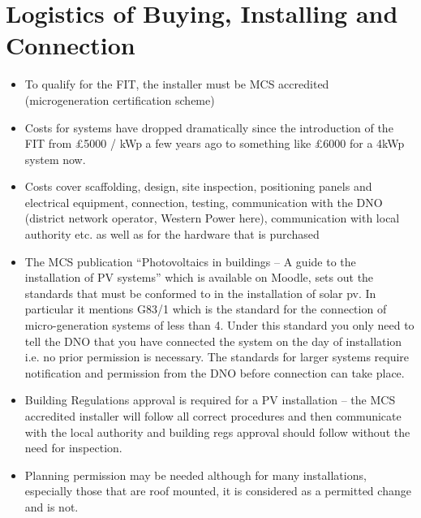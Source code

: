 \documentclass{article}
\begin{document}
\section{Logistics of Buying, Installing and Connection}
\begin{itemize}
\item To qualify for the FIT, the installer must be MCS accredited (microgeneration certification scheme)
\item Costs for systems have dropped dramatically since the introduction of the FIT from £5000 / kWp a few years ago to something like £6000 for a 4kWp system now.
\item Costs cover scaffolding, design, site inspection, positioning panels and electrical equipment, connection, testing, communication with the DNO (district network operator, Western Power here), communication with local authority etc. as well as for the hardware that is purchased
\item The MCS publication “Photovoltaics in buildings – A guide to the installation of PV systems” \cite{MCS_PV_Guide} which is available on Moodle, sets out the standards that must be conformed to in the installation of solar pv. In particular it mentions G83/1 which is the standard for the connection of micro-generation systems of less than \SI{4}{\kilowattpeak}. Under this standard you only need to tell the DNO that you have connected the system on the day of installation i.e. no prior permission is necessary. The standards for larger systems require notification and permission from the DNO before connection can take place. 
\item Building Regulations approval is required for a PV installation – the MCS accredited installer will follow all correct procedures and then communicate with the local authority and building regs approval should follow without the need for inspection.
\item Planning permission may be needed although for many installations, especially those that are roof mounted, it is considered as a permitted change and is not.
\end{itemize}
\end{document}

